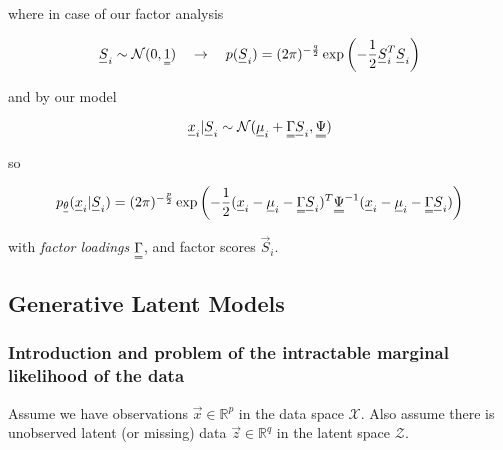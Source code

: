 where in case of our factor analysis

\begin{equation}
    \vec{S}_i \sim \mathcal{N}(0, \mat{1}) \quad \rightarrow \quad p(\vec{S}_i) = (2\pi)^{-\frac{q}{2}} \exp \left( -\frac{1}{2} \vec{S}_i^T \vec{S}_i \right)
\end{equation}

and by our model

\begin{equation}
    \vec{x}_i | \vec{S}_i \sim \mathcal{N}(\vec{\mu}_i + \mat{\Gamma} \vec{S}_i, \mat{\Psi})
\end{equation}

so

\begin{equation}
    p_\vec{\theta}(\vec{x}_i | \vec{S}_i) = (2\pi)^{-\frac{p}{2}} \exp \left( -\frac{1}{2} (\vec{x}_i - \vec{\mu}_i - \mat{\Gamma} \vec{S}_i)^T \mat{\Psi}^{-1} (\vec{x}_i - \vec{\mu}_i - \mat{\Gamma} \vec{S}_i) \right)
\end{equation}

with \textit{factor loadings} $\mat{\Gamma}$, and factor scores $\vec{S}_i$.



\subsection{Generative Latent Models}
\subsubsection{Introduction and problem of the intractable marginal likelihood of the data}
Assume we have observations $\vec{x} \in \mathbb{R}^p$ in the data space $\mathcal{X}$. 
Also assume there is unobserved latent (or missing) 
data $\vec{z} \in \mathbb{R}^q$ in the latent space $\mathcal{Z}$.

